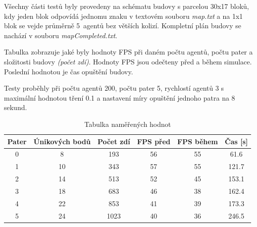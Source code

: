 \documentclass[czech,public,dept460,male,cpdeclaration]{diploma}
\begin{document}
Všechny části testů byly provedeny na schématu budovy s parcelou 30x17 bloků, kdy jeden blok odpovídá jednomu znaku v textovém souboru \textit{map.txt} a na 1x1 blok se vejde průměrně 5~agentů bez větších kolizí. Kompletní plán budovy se nachází v souboru \textit{mapCompleted.txt}.

Tabulka zobrazuje jaké byly hodnoty FPS při daném počtu agentů, počtu pater a složitosti budovy \textit{(počet zdí)}. Hodnoty FPS jsou odečteny před a během simulace. Poslední hodnotou je čas opuštění budovy.

Testy proběhly při počtu agentů 200, počtu pater 5, rychlostí agentů 3 s maximální hodnotou tření 0.1 a nastavení míry opuštění jednoho patra na 8 sekund.


\begin{table}[H]
	\centering
	\caption{Tabulka naměřených hodnot}
	\label{tab:tablePC2}
	\renewcommand{\arraystretch}{1.0}
	\begin{tabular}{| c | c | c | c | c | c |}
		\hline
		Pater  & Únikových bodů & Počet zdí & FPS před & FPS během & Čas [s]\\\hline
		0 & 8 & 193 & 56 & 55 & 61.6\\
		1 & 10 & 343 & 57 & 55 & 121.7\\
		2 & 14 & 513 & 52 & 45 & 153.1\\
		3 & 18 & 683 & 46 & 38 & 162.4\\
		4 & 22 & 853 & 41 & 39 & 173.3\\
		5 & 24 & 1023 & 40 & 36 & 246.5\\
		\hline
	\end{tabular}
\end{table}
\end{document}

